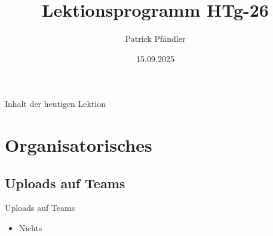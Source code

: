 



\title{\textbf{Lektionsprogramm HTg-26}}
\author{Patrick Pfändler}



\date{15.09.2025}




\frame{\titlepage}


\folieFragen



\begin{frame}{Inhalt der heutigen Lektion}
    \tableofcontents
\end{frame}





\section{Organisatorisches}
\BlueSectionSlide

\subsection{Uploads auf Teams}
\begin{frame}{Uploads auf Teams}
    \begin{itemize}
        \item[\textbullet] Nichts
    \end{itemize}
\end{frame}

